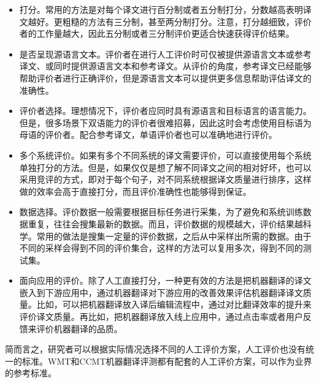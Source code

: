 \begin{itemize}
\vspace{0.5em}
\item 打分。常用的方法是对每个译文进行百分制或者五分制打分，分数越高表明译文越好。更粗糙的方法有三分制，甚至两分制打分。注意，打分越细致，评价者的工作量越大，因此五分制或者三分制评价更适合快速获得评价结果。
\vspace{0.5em}
\item 是否呈现源语言文本。评价者在进行人工评价时可仅被提供源语言文本或参考译文、或同时提供源语言文本和参考译文。从评价的角度，参考译文已经能够帮助评价者进行正确评价，但是源语言文本可以提供更多信息帮助评估译文的准确性。
\vspace{0.5em}
\item 评价者选择。理想情况下，评价者应同时具有源语言和目标语言的语言能力。但是，很多场景下双语能力的评价者很难招募，因此这时会考虑使用目标语为母语的评价者。配合参考译文，单语评价者也可以准确地进行评价。
\vspace{0.5em}
\item 多个系统评价。如果有多个不同系统的译文需要评价，可以直接使用每个系统单独打分的方法。但是，如果仅仅是想了解不同译文之间的相对好坏，也可以采用竞评的方式，即对于每个句子，对不同系统根据译文质量进行排序，这样做的效率会高于直接打分，而且评价准确性也能够得到保证。
\vspace{0.5em}
\item 数据选择。评价数据一般需要根据目标任务进行采集，为了避免和系统训练数据重复，往往会搜集最新的数据。而且，评价数据的规模越大，评价结果越科学。常用的做法是搜集一定量的评价数据，之后从中采样出所需的数据。由于不同的采样会得到不同的评价集合，这样的方法可以复用多次，得到不同的测试集。
\vspace{0.5em}
\item 面向应用的评价。除了人工直接打分，一种更有效的方法是把机器翻译的译文嵌入到下游应用中，通过机器翻译对下游应用的改善效果评估机器翻译译文质量。比如，可以把机器翻译放入译后编辑流程中，通过对比翻译效率的提升来评价译文质量。再比如，把机器翻译放入线上应用中，通过点击率或者用户反馈来评价机器翻译的品质。
\vspace{0.5em}
\end{itemize}

\parinterval 简而言之，研究者可以根据实际情况选择不同的人工评价方案，人工评价也没有统一的标准。WMT和CCMT机器翻译评测都有配套的人工评价方案，可以作为业界的参考标准。


